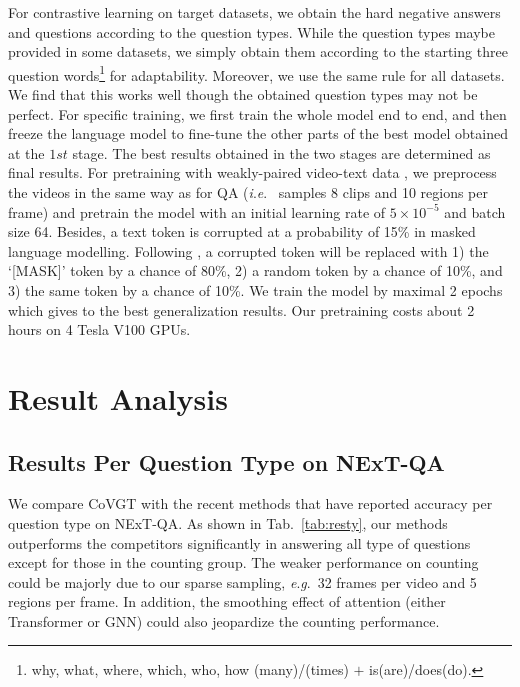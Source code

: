 \documentclass[10pt,journal,compsoc]{IEEEtran}
\newcommand{\ie}{\textit{i}.\textit{e}.}
\newcommand{\eg}{\textit{e}.\textit{g}.}
\begin{document}
For contrastive learning on target datasets, we obtain the hard negative answers and questions according to the question types. While the question types maybe provided in some datasets, we simply obtain them according to the starting three question words\footnote{why, what, where, which, who, how (many)/(times) $+$ is(are)/does(do).} for adaptability. Moreover, we use the same rule for all datasets. We find that this works well though the obtained question types may not be perfect. For specific training, we first train the whole model end to end, and then freeze the language model to fine-tune the other parts of the best model obtained at the $1st$ stage. The best results obtained in the two stages are determined as final results. 
For pretraining with weakly-paired video-text data \cite{bain2021frozen}, we preprocess the videos in the same way as for QA (\ie~ samples 8 clips and 10 regions per frame) and pretrain the model with an initial learning rate of $5\times10^{-5}$ and batch size 64. Besides, a text token is corrupted at a probability of 15\% in masked language modelling. Following \cite{liu2019roberta,yang2021just}, a corrupted token will be replaced with 1) the `[MASK]' token by a chance of 80\%, 2) a random token by a chance of 10\%, and 3) the same token by a chance of 10\%. We train the model by maximal 2 epochs which gives to the best generalization results. Our pretraining costs about 2 hours on 4 Tesla V100 GPUs.

\section{Result Analysis}
\subsection{Results Per Question Type on NExT-QA}
\label{app:comp}
We compare CoVGT with the recent methods that have reported accuracy per question type on NExT-QA. As shown in Tab.~\ref{tab:resty}, our methods outperforms the competitors significantly in answering all type of questions except for those in the counting group. The weaker performance on counting could be majorly due to our sparse sampling, \eg~32 frames per video and 5 regions per frame. In addition, the smoothing effect of attention (either Transformer or GNN) could also jeopardize the counting performance.
\end{document}
